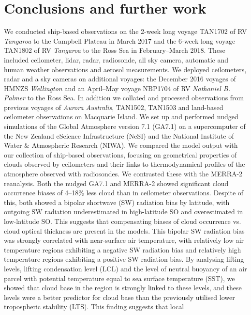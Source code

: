 \chapter{Conclusions and further work}

We conducted ship-based observations on the 2-week long voyage TAN1702 of
RV \textit{Tangaroa} to the Campbell Plateau
in March 2017 and the 6-week long voyage TAN1802 of RV \textit{Tangaroa} to the Ross Sea
in February--March 2018. These included ceilometer, lidar, radar, radiosonde,
all sky camera, automatic and human weather observations and aerosol measurements.
We deployed ceilometers, radar and a sky cameras on additional voyages:
the December 2016 voyages of HMNZS \textit{Wellington} and an 
April--May voyage NBP1704 of RV \textit{Nathaniel B. Palmer} to the Ross Sea.
In addition we collated and processed observations from previous voyages
of \textit{Aurora Australis}, TAN1502, TAN1503 and land-based ceilometer
observations on Macquarie Island.
We set up and performed nudged simulations
of the Global Atmosphere version 7.1 (GA7.1) on a supercomputer of the New Zealand eScience Infrastructure (NeSI) and the National Institute of Water \& Atmospheric Research (NIWA).
We compared the model output with our collection of ship-based observations,
focusing on geometrical properties of clouds observed by ceilometers and their
links to thermodynamical profiles of the atmosphere observed with radiosondes.
We contrasted these with the MERRA-2 reanalysis. Both the nudged GA7.1 and MERRA-2
showed significant cloud occurrence biases of 4--18\% less cloud than in
ceilometer observations. Despite of this, both showed a bipolar shortwave (SW)
radiation
bias by latitude, with outgoing SW radiation underestimated in high-latitude
SO and overestimated in low-latitude SO. This suggests that compensating biases
of cloud occurrence vs. cloud optical thickness are present in the models.
This bipolar SW radiation bias was strongly correlated with near-surface air temperature,
with relatively low air temperature regions exhibiting a negative SW radiation bias and
relatively high temperature regions exhibiting a positive SW radiation bias. By analysing
lifting levels, lifting condensation level (LCL) and the level of neutral buoyancy
of an air parcel with potential temperature equal to sea surface temperature (SST),
we showed that cloud base in the region is strongly linked to these levels,
and these levels were a better predictor for cloud base than the previously
utilised lower tropospheric stability (LTS). This finding suggests that local
